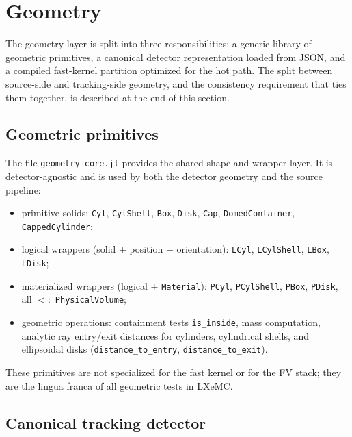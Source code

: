 \documentclass[11pt]{article}
\begin{document}
\section{Geometry}
\label{sec:geometry}

The geometry layer is split into three responsibilities: a generic library of
geometric primitives, a canonical detector representation loaded from JSON,
and a compiled fast-kernel partition optimized for the hot path. The split
between source-side and tracking-side geometry, and the consistency
requirement that ties them together, is described at the end of this section.

\subsection{Geometric primitives}
\label{sec:geometry-core}

The file \texttt{geometry\_core.jl} provides the shared shape and wrapper
layer. It is detector-agnostic and is used by both the detector geometry
and the source pipeline:

\begin{itemize}
\item primitive solids: \texttt{Cyl}, \texttt{CylShell}, \texttt{Box},
\texttt{Disk}, \texttt{Cap}, \texttt{DomedContainer}, \texttt{CappedCylinder};
\item logical wrappers (solid + position $\pm$ orientation):
\texttt{LCyl}, \texttt{LCylShell}, \texttt{LBox}, \texttt{LDisk};
\item materialized wrappers (logical $+$ \texttt{Material}):
\texttt{PCyl}, \texttt{PCylShell}, \texttt{PBox}, \texttt{PDisk}, all
$<:$ \texttt{PhysicalVolume};
\item geometric operations: containment tests \texttt{is\_inside}, mass
computation, analytic ray entry/exit distances for cylinders, cylindrical
shells, and ellipsoidal disks (\texttt{distance\_to\_entry},
\texttt{distance\_to\_exit}).
\end{itemize}

These primitives are not specialized for the fast kernel or for the FV stack;
they are the lingua franca of all geometric tests in LXeMC.

\subsection{Canonical tracking detector}
\label{sec:geometry-tracking}
\end{document}
